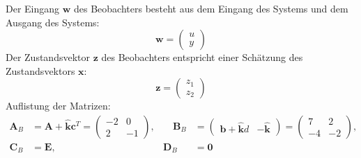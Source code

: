 \documentclass[crop=false]{standalone}
\begin{document}
\begin{task}
\begin{enumerate}[i]
\begin{solution}
Der Eingang $\mathbf{w}$ des Beobachters besteht aus dem Eingang des Systems und dem Ausgang des Systems:
\[\mathbf{w} = \begin{pmatrix}
u \\ y
\end{pmatrix}
\]
Der Zustandsvektor $\mathbf{z}$ des Beobachters entspricht einer Schätzung des Zustandsvektors $\mathbf{x}$:
\[\mathbf{z} = \begin{pmatrix}
z_1 \\ z_2
\end{pmatrix}
\]
Auflistung der Matrizen:
\[
\begin{aligned}
\mathbf{A}_B &= \mathbf{A}+\hat{\mathbf{k}} \mathbf{c}^{T} = \begin{pmatrix}
-2 & 0 \\
2 & -1
\end{pmatrix}, &\quad
\mathbf{B}_B &= 
\begin{pmatrix}
\mathbf{b}+\hat{\mathbf{k}} d &  - \hat{\mathbf{k}}
\end{pmatrix}
= \begin{pmatrix}
7 & 2 \\
-4 & -2
\end{pmatrix},\\
\mathbf{C}_B &= \mathbf{E},
&
\mathbf{D}_B &= \mathbf{0}
\end{aligned}
\]
\end{solution}

\end{enumerate}
\end{task}
\end{document}
